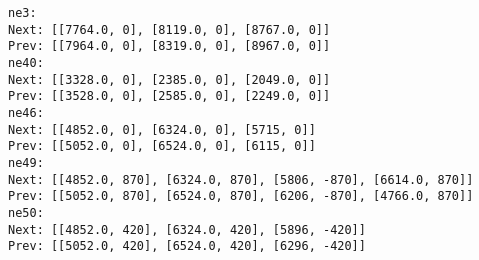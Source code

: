 	\begin{lstlisting}[language = {}, caption = SafePoints.RNA, label = {lst:EJ9_5}]
ne3:
Next: [[7764.0, 0], [8119.0, 0], [8767.0, 0]]
Prev: [[7964.0, 0], [8319.0, 0], [8967.0, 0]]
ne40:
Next: [[3328.0, 0], [2385.0, 0], [2049.0, 0]]
Prev: [[3528.0, 0], [2585.0, 0], [2249.0, 0]]
ne46:
Next: [[4852.0, 0], [6324.0, 0], [5715, 0]]
Prev: [[5052.0, 0], [6524.0, 0], [6115, 0]]
ne49:
Next: [[4852.0, 870], [6324.0, 870], [5806, -870], [6614.0, 870]]
Prev: [[5052.0, 870], [6524.0, 870], [6206, -870], [4766.0, 870]]
ne50:
Next: [[4852.0, 420], [6324.0, 420], [5896, -420]]
Prev: [[5052.0, 420], [6524.0, 420], [6296, -420]]
	\end{lstlisting}	
	